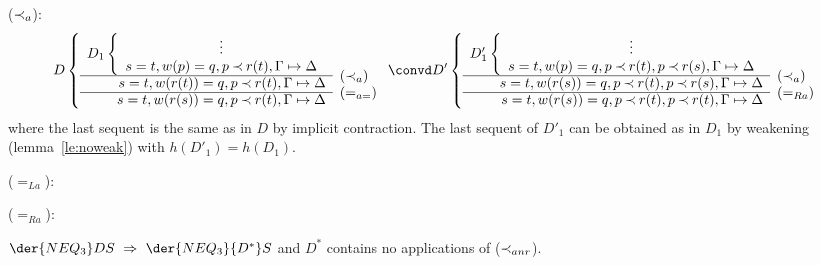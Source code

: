 \begin{PROOF}
\begin{LS}
%
\item ($\mathbin{\prec}_a$):
\[D \left\{ \begin{array}{rl} D_1\left\{\begin{array}{c} \vdots \\
s=t, w(p)=q, p\Incl r(t),\Gamma \Seq \Delta \end{array}\right. & \\ \cline{1-1}
s=t, w(r(t))=q, p\Incl r(t),\Gamma \Seq \Delta  &   
         \raisebox{1.2ex}[1.5ex][0ex]{($\Incl_a$)} \\ \cline{1-1}
s=t, w(r(s))=q, p\Incl r(t),\Gamma \Seq\Delta & \raisebox{1.2ex}[1.5ex][0ex]{($=_{a=}$)} 
\end{array} \right. \convd
%
D' \left\{ \begin{array}{rl} D'_1\left\{ \begin{array}{c} \vdots \\
s=t, w(p)=q, p\Incl r(t), p\Incl r(s),\Gamma \Seq \Delta\end{array}\right. \\ \cline{1-1}
s=t, w(r(s))=q, p\Incl r(t), p\Incl r(s), \Gamma \Seq \Delta  & 
   \raisebox{1.2ex}[1.5ex][0ex]{($\Incl_a$)} \\ \cline{1-1}
s=t, w(r(s))=q, p\Incl r(t),p\Incl r(t),\Gamma \Seq\Delta  &
   \raisebox{1.2ex}[1.5ex][0ex]{($=_{Ra}$)}
\end{array} \right. \]
%
where the last sequent is the same as in $D$ by implicit contraction. The last sequent 
of $D'_1$ can be obtained as in $D_1$ by weakening (lemma~\ref{le:noweak})
with $h(D'_1)=h(D_1)$.
%
\item ($=_{La}$):

\item ($=_{Ra}$):
\end{LS}
\end{PROOF}
%
\begin{LEMMA}\label{le:noar} $\der{NEQ_3}DS\ \impl\ \der{NEQ_3}{D^*}S$
and $D^*$ contains no applications of ($\mathbin{\prec}_{anr}$).
\end{LEMMA}
